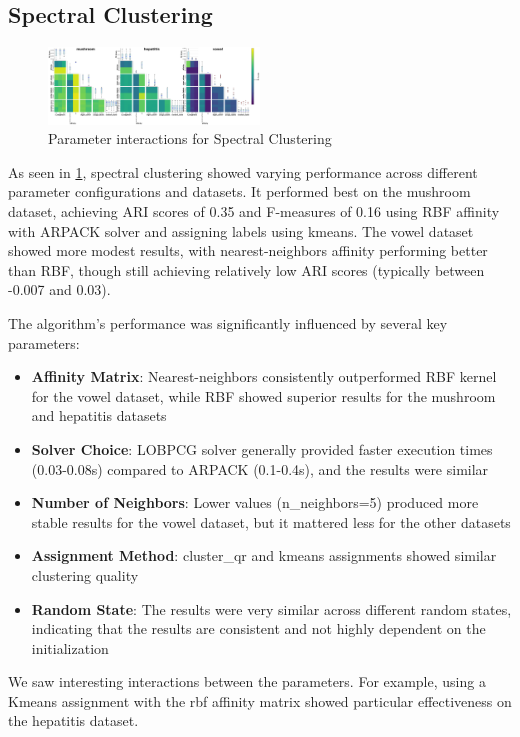 \subsection{Spectral Clustering}
\label{subsec:spectralclusteringresults}

\begin{figure}[ht!]
    \includegraphics[width=0.5\textwidth]{figures/interactions_spectral_clustering.png}
    \caption{Parameter interactions for Spectral Clustering}
    \label{fig:interactions_spectral}
\end{figure}

As seen in \ref{fig:interactions_spectral}, spectral clustering showed varying performance across different parameter configurations and datasets. It performed best on the mushroom dataset, achieving ARI scores of 0.35 and F-measures of 0.16 using RBF affinity with ARPACK solver and assigning labels using kmeans. The vowel dataset showed more modest results, with nearest-neighbors affinity performing better than RBF, though still achieving relatively low ARI scores (typically between -0.007 and 0.03).

The algorithm's performance was significantly influenced by several key parameters:

\begin{itemize}
    \item \textbf{Affinity Matrix}: Nearest-neighbors consistently outperformed RBF kernel for the vowel dataset, while RBF showed superior results for the mushroom and hepatitis datasets
    \item \textbf{Solver Choice}: LOBPCG solver generally provided faster execution times (0.03-0.08s) compared to ARPACK (0.1-0.4s), and the results were similar
    \item \textbf{Number of Neighbors}: Lower values (n\_neighbors=5) produced more stable results for the vowel dataset, but it mattered less for the other datasets
    \item \textbf{Assignment Method}: cluster\_qr and kmeans assignments showed similar clustering quality
    \item \textbf{Random State}: The results were very similar across different random states, indicating that the results are consistent and not highly dependent on the initialization
\end{itemize}

We saw interesting interactions between the parameters. For example, using a Kmeans assignment with the rbf affinity matrix showed particular effectiveness on the hepatitis dataset.

